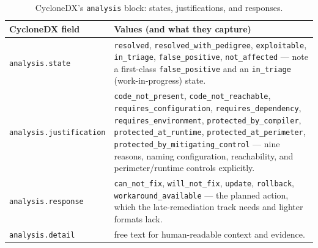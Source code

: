 \documentclass[11pt]{article}
\newcommand{\code}[1]{\texttt{#1}}
\begin{document}
\begin{table}[H]
\centering
\footnotesize
\renewcommand{\arraystretch}{1.2}
\begin{tabular}{>{\raggedright\arraybackslash}p{} >{\raggedright\arraybackslash}p{}}
\toprule
\textbf{CycloneDX field} & \textbf{Values (and what they capture)} \\
\midrule
\code{analysis.state} & \code{resolved}, \code{resolved\_with\_pedigree},
  \code{exploitable}, \code{in\_triage}, \code{false\_positive},
  \code{not\_affected} --- note a first-class \code{false\_positive} and an
  \code{in\_triage} (work-in-progress) state. \\
\code{analysis.justification} & \code{code\_not\_present}, \code{code\_not\_reachable},
  \code{requires\_configuration}, \code{requires\_dependency},
  \code{requires\_environment}, \code{protected\_by\_compiler},
  \code{protected\_at\_runtime}, \code{protected\_at\_perimeter},
  \code{protected\_by\_mitigating\_control} --- nine reasons, naming configuration,
  reachability, and perimeter/runtime controls explicitly. \\
\code{analysis.response} & \code{can\_not\_fix}, \code{will\_not\_fix}, \code{update},
  \code{rollback}, \code{workaround\_available} --- the planned action, which the
  late-remediation track needs and lighter formats lack. \\
\code{analysis.detail} & free text for human-readable context and evidence. \\
\bottomrule
\end{tabular}
\caption{CycloneDX's \code{analysis} block: states, justifications, and responses.}
\end{table}
\end{document}
